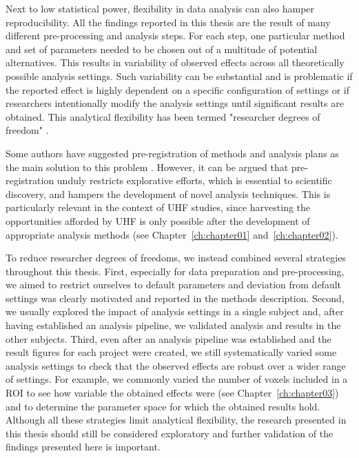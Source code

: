 Next to low statistical power, flexibility in data analysis can also hamper reproducibility. All the findings reported in this thesis are the result of many different pre-processing and analysis steps. For each step, one particular method and set of parameters needed to be chosen out of a multitude of potential alternatives. This results in variability of observed effects across all theoretically possible analysis settings. Such variability can be substantial \parencite{Carp2012} and is problematic if the reported effect is highly dependent on a specific configuration of settings or if researchers intentionally modify the analysis settings until significant results are obtained. This analytical flexibility has been termed "researcher degrees of freedom" \parencite{Simmons2011}.

Some authors have suggested pre-registration of methods and analysis plans as the main solution to this problem \parencite{Poldrack2017a}. However, it can be argued that pre-registration unduly restricts explorative efforts, which is essential to scientific discovery, and hampers the development of novel analysis techniques. This is particularly relevant in the context of UHF studies, since harvesting the opportunities afforded by UHF is only possible after the development of appropriate analysis methods (see Chapter~\ref{ch:chapter01} and~\ref{ch:chapter02}).

To reduce researcher degrees of freedoms, we instead combined several strategies throughout this thesis. First, especially for data preparation and pre-processing, we aimed to restrict ourselves to default parameters and deviation from default settings was clearly motivated and reported in the methods description. Second, we usually explored the impact of analysis settings in a single subject and, after having established an analysis pipeline, we validated analysis and results in the other subjects. Third, even after an analysis pipeline was established and the result figures for each project were created, we still systematically varied some analysis settings to check that the observed effects are robust over a wider range of settings. For example, we commonly varied the number of voxels included in a ROI to see how variable the obtained effects were (see Chapter~\ref{ch:chapter03}) and to determine the parameter space for which the obtained results hold. Although all these strategies limit analytical flexibility, the research presented in this thesis should still be considered exploratory and further validation of the findings presented here is important.

